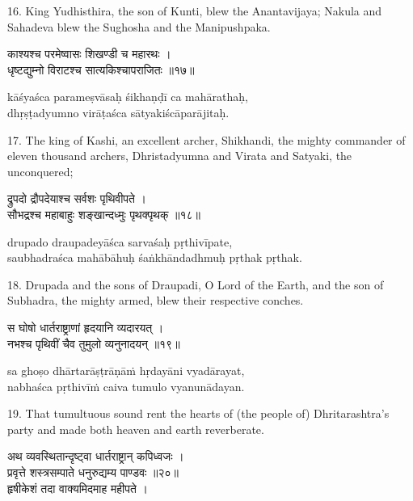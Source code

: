 16. King Yudhisthira, the son of Kunti, blew the Anantavijaya; Nakula and
Sahadeva blew the Sughosha and the Manipushpaka.

\begin{gitaverse}
काश्यश्च परमेष्वासः शिखण्डी च महारथः । \\
धृष्टद्युम्नो विराटश्च सात्यकिश्चापराजितः ॥१७॥
\end{gitaverse}

\begin{transliteration}
kāśyaśca parameṣvāsaḥ śikhaṇḍī ca mahārathaḥ, \\
dhṛṣṭadyumno virāṭaśca sātyakiścāparājitaḥ.
\end{transliteration}

17. The king of Kashi, an excellent archer, Shikhandi, the mighty commander of
eleven thousand archers, Dhristadyumna and Virata and Satyaki, the unconquered;

\begin{gitaverse}
द्रुपदो द्रौपदेयाश्च सर्वशः पृथिवीपते । \\
सौभद्रश्च महाबाहुः शङ्खान्दध्मुः पृथक्पृथक् ॥१८॥
\end{gitaverse}

\begin{transliteration}
drupado draupadeyāśca sarvaśaḥ pṛthivīpate, \\
saubhadraśca mahābāhuḥ śaṅkhāndadhmuḥ pṛthak pṛthak.
\end{transliteration}

18. Drupada and the sons of Draupadi, O Lord of the Earth, and the son of
Subhadra, the mighty armed, blew their respective conches.

\begin{gitaverse}
स घोषो धार्तराष्ट्राणां हृदयानि व्यदारयत् । \\
नभश्च पृथिवीं चैव तुमुलो व्यनुनादयन् ॥१९॥
\end{gitaverse}

\begin{transliteration}
sa ghoṣo dhārtarāṣṭrāṇāṁ hṛdayāni vyadārayat, \\
nabhaśca pṛthivīṁ caiva tumulo vyanunādayan.
\end{transliteration}

19. That tumultuous sound rent the hearts of (the people of) Dhritarashtra's
party and made both heaven and earth reverberate.

\begin{gitaverse}
अथ व्यवस्थितान्दृष्ट्वा धार्तराष्ट्रान् कपिध्वजः । \\
प्रवृत्ते शस्त्रसम्पाते धनुरुद्यम्य पाण्डवः ॥२०॥ \\
हृषीकेशं तदा वाक्यमिदमाह महीपते ।
\end{gitaverse}


